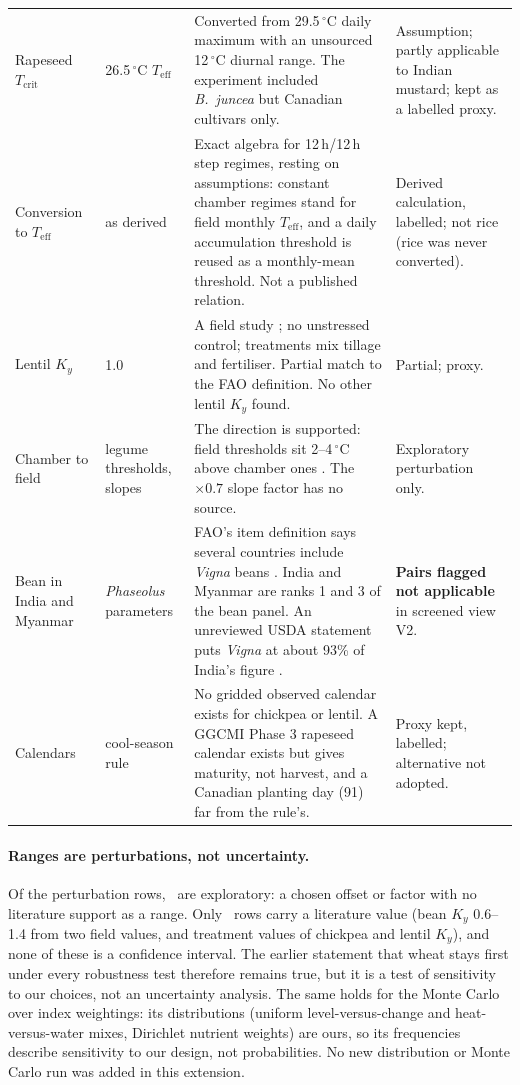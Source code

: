 \begin{table}[H]
\begin{tabular}{@{}p{2.2cm}p{1.9cm}p{6.7cm}p{3.9cm}@{}}
Rapeseed $T_{\text{crit}}$ & 26.5\,$^\circ$C $T_{\text{eff}}$ & Converted from 29.5\,$^\circ$C daily maximum \citep{morrison2002} with an unsourced 12\,$^\circ$C diurnal range. The experiment included \emph{B.~juncea} but Canadian cultivars only. & Assumption; partly applicable to Indian mustard; kept as a labelled proxy. \\
Conversion to $T_{\text{eff}}$ & as derived & Exact algebra for 12\,h/12\,h step regimes, resting on assumptions: constant chamber regimes stand for field monthly $T_{\text{eff}}$, and a daily accumulation threshold is reused as a monthly-mean threshold. Not a published relation. & Derived calculation, labelled; not rice (rice was never converted). \\
Lentil $K_y$ & 1.0 & A field study \citep{nandi2021}; no unstressed control; treatments mix tillage and fertiliser. Partial match to the FAO definition. No other lentil $K_y$ found. & Partial; proxy. \\
Chamber to field & legume thresholds, slopes & The direction is supported: field thresholds sit 2--4\,$^\circ$C above chamber ones \citep{devasirvatham2013,morrison2002}. The $\times0.7$ slope factor has no source. & Exploratory perturbation only. \\
Bean in India and Myanmar & \emph{Phaseolus} parameters & FAO's item definition says several countries include \emph{Vigna} beans \citep{fao1994commodities}. India and Myanmar are ranks 1 and 3 of the bean panel. An unreviewed USDA statement puts \emph{Vigna} at about 93\% of India's figure \citep{phaseoluscgc2020}. & \textbf{Pairs flagged not applicable} in screened view V2. \\
Calendars & cool-season rule & No gridded observed calendar exists for chickpea or lentil. A GGCMI Phase 3 rapeseed calendar exists \citep{ggcmi3calendar} but gives maturity, not harvest, and a Canadian planting day (91) far from the rule's. & Proxy kept, labelled; alternative not adopted. \\
\bottomrule
\end{tabular}
\end{table}

\paragraph{Ranges are perturbations, not uncertainty.} Of the perturbation rows, \parNExploratory\ are exploratory:
a chosen offset or factor with no literature support as a range. Only \parNLitRange\ rows carry a literature value
(bean $K_y$ 0.6--1.4 from two field values, and treatment values of chickpea and lentil $K_y$), and none of these is
a confidence interval. The earlier statement that wheat stays first under every robustness test therefore remains true, but it is
a test of sensitivity to our choices, not an uncertainty analysis. The same holds for the Monte Carlo over index
weightings: its distributions (uniform level-versus-change and heat-versus-water mixes, Dirichlet nutrient weights)
are ours, so its frequencies describe sensitivity to our design, not probabilities. No new distribution or Monte
Carlo run was added in this extension.

